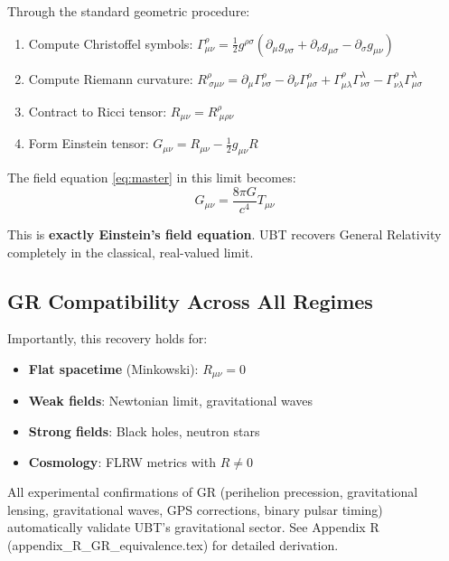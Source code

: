 \documentclass[12pt]{article}
\begin{document}
Through the standard geometric procedure:
\begin{enumerate}
    \item Compute Christoffel symbols: $\Gamma^\rho_{\mu\nu} = \frac{1}{2} g^{\rho\sigma}(\partial_\mu g_{\nu\sigma} + \partial_\nu g_{\mu\sigma} - \partial_\sigma g_{\mu\nu})$
    
    \item Compute Riemann curvature: $R^\rho_{\ \sigma\mu\nu} = \partial_\mu \Gamma^\rho_{\nu\sigma} - \partial_\nu \Gamma^\rho_{\mu\sigma} + \Gamma^\rho_{\mu\lambda} \Gamma^\lambda_{\nu\sigma} - \Gamma^\rho_{\nu\lambda} \Gamma^\lambda_{\mu\sigma}$
    
    \item Contract to Ricci tensor: $R_{\mu\nu} = R^\rho_{\ \mu\rho\nu}$
    
    \item Form Einstein tensor: $G_{\mu\nu} = R_{\mu\nu} - \frac{1}{2}g_{\mu\nu}R$
\end{enumerate}

The field equation \eqref{eq:master} in this limit becomes:
\begin{equation}
    G_{\mu\nu} = \frac{8\pi G}{c^4} T_{\mu\nu}
    \label{eq:einstein}
\end{equation}

This is \textbf{exactly Einstein's field equation}. UBT recovers General Relativity completely in the classical, real-valued limit.

\subsection{GR Compatibility Across All Regimes}

Importantly, this recovery holds for:
\begin{itemize}
    \item \textbf{Flat spacetime} (Minkowski): $R_{\mu\nu} = 0$
    \item \textbf{Weak fields}: Newtonian limit, gravitational waves
    \item \textbf{Strong fields}: Black holes, neutron stars
    \item \textbf{Cosmology}: FLRW metrics with $R \neq 0$
\end{itemize}

All experimental confirmations of GR (perihelion precession, gravitational lensing, gravitational waves, GPS corrections, binary pulsar timing) automatically validate UBT's gravitational sector. See Appendix R (appendix\_R\_GR\_equivalence.tex) for detailed derivation.
\end{document}
